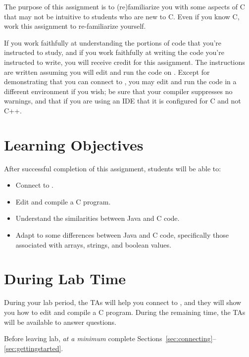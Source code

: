 The purpose of this assignment is to (re)familiarize you with some aspects of C that may not be intuitive to students who are new to C\@.
Even if you know C, work this assignment to re-familiarize yourself.

If you work faithfully at understanding the portions of code that you're instructed to study, and if you work faithfully at writing the code you're instructed to write, you will receive credit for this assignment.
The instructions are written assuming you will edit and run the code on \runtimeenvironment.
Except for demonstrating that you can connect to \runtimeenvironment, you may edit and run the code in a different environment if you wish;
be sure that your compiler suppresses no warnings, and that if you are using an IDE that it is configured for C and not C++.

\tableofcontents

\section*{Learning Objectives}

After successful completion of this assignment, students will be able to:
\begin{itemize}
    \item Connect to \runtimeenvironment.
    \item Edit and compile a C program.
    \item Understand the similarities between Java and C code.
    \item Adapt to some differences between Java and C code, specifically those
        associated with arrays, strings, and boolean values.
\end{itemize}

\section*{During Lab Time}

During your lab period, the TAs will help you connect to \runtimeenvironment, and they will show you how to edit and compile a C program.
During the remaining time, the TAs will be available to answer questions.

Before leaving lab, \textit{at a minimum} complete Sections~\ref{sec:connecting}--\ref{sec:gettingstarted}.
